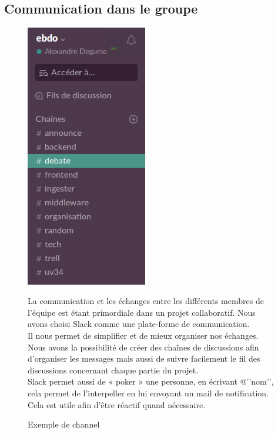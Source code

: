 \documentclass[a4paper]{article}
\begin{document}
\subsection{Communication dans le groupe}
\begin{figure}[h]
\begin{minipage}{.48\textwidth}
	\centering
	\includegraphics[width=200px]{./tmp/ChanSlack.png}
	\caption{Exemple de channel}
\end{minipage}
\begin{minipage}{.48\textwidth}

La communication et les échanges entre les différents
membres de l’équipe est étant primordiale dans un
projet collaboratif. Nous avons choisi Slack comme une
plate-forme de communication.
\\

Il nous permet de simplifier et de mieux organiser nos
échanges. Nous avons la possibilité de créer des
chaînes de discussions afin d’organiser les messages
mais aussi de suivre facilement le fil des discussions
concernant chaque partie du projet.
\\

Slack permet aussi de « poker » une personne, en
écrivant @’’nom’’, cela permet de l’interpeller en lui
envoyant un mail de notification. Cela est utile afin
d’être réactif quand nécessaire.
\end{minipage}
\end{figure}
\end{document}
